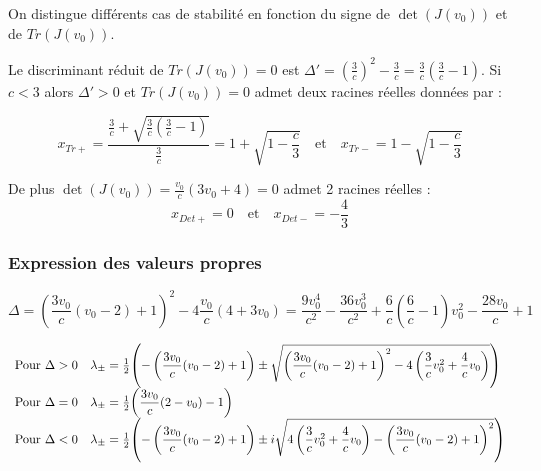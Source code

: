\documentclass[12pt,a4paper,onecolumn]{article}
\begin{document}
On distingue différents cas de stabilité en fonction du signe de $ \det(J(v_0))$ et de $Tr(J(v_0))$.

Le discriminant réduit de $Tr(J(v_0)) = 0$ est $\Delta' = \left(\frac{3}{c}\right)^2 - \frac{3}{c} = \frac{3}{c}(\frac{3}{c} - 1)$. Si $c < 3$ alors $\Delta' > 0$ et $Tr(J(v_0)) = 0$ admet deux racines réelles données par :

\begin{equation}
x_{Tr+} = \displaystyle{\frac{\frac{3}{c} + \sqrt{ \frac{3}{c}(\frac{3}{c} - 1)}}{\frac{3}{c}}} = \displaystyle{1 + \sqrt{1 - \frac{c}{3}}}\quad \text{et}\quad x_{Tr-} = \displaystyle{1 - \sqrt{1 - \frac{c}{3}}}
\label{TrJ}
\end{equation}

De plus $\det(J(v_0)) = \frac{v_0}{c}(3v_0 + 4) = 0$ admet 2 racines réelles :
\begin{equation}
x_{Det+} = 0 \quad \text{et} \quad x_{Det-} = \displaystyle{-\frac{4}{3}} \label{DetJ}
\end{equation}


\subsubsection{Expression des valeurs propres}

$$\Delta = \left(\frac{3v_0}{c}(v_0 - 2) + 1\right)^2 - 4\frac{v_0}{c}(4 + 3v_0) = \frac{9v_0^4}{c^2} - \frac{36v_0^3}{c^2} + \frac{6}{c}(\frac{6}{c} - 1)v_0^2 - \frac{28v_0}{c} + 1$$


$$
\begin{array}{l l}
\text{Pour }\Delta > 0 &\lambda_{\pm} = \frac{1}{2}\displaystyle{\left(-\left(\frac{3v_0}{c}(v_0 - 2) + 1\right) \pm \sqrt{\left(\frac{3v_0}{c}(v_0 - 2) + 1\right)^2-4\left(\frac{3}{c}v_0^2 + \frac{4}{c}v_0\right)}\right)} \\
 {\text{Pour }\Delta = 0} &\lambda_{\pm} = \frac{1}{2}\displaystyle{\left(\frac{3v_0}{c}(2 - v_0) - 1\right)} \\
{\text{Pour }\Delta < 0} &\lambda_{\pm} = \frac{1}{2}\displaystyle{\left(-\left(\frac{3v_0}{c}(v_0 - 2) + 1\right) \pm i\sqrt{4\left(\frac{3}{c}v_0^2 + \frac{4}{c}v_0\right) - \left(\frac{3v_0}{c}(v_0 - 2) + 1\right)^2}\right)} \\
\end{array}
$$


\end{document}
